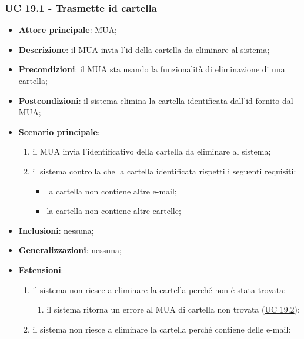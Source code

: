 \subsubsection{UC 19.1 - Trasmette id cartella} \label{sec:UC19.1}
    \begin{itemize}
        \item \textbf{Attore principale}: MUA;
        \item \textbf{Descrizione}: il MUA invia l'id della cartella da eliminare al sistema;
        \item \textbf{Precondizioni}: il MUA sta usando la funzionalità di eliminazione di una cartella;
        \item \textbf{Postcondizioni}: il sistema elimina la cartella identificata dall'id fornito dal MUA;
        \item \textbf{Scenario principale}:
            \begin{enumerate}
                \item il MUA invia l'identificativo della cartella da eliminare al sistema;
                \item il sistema controlla che la cartella identificata rispetti i seguenti requisiti:
                \begin{itemize}
                    \item la cartella non contiene altre e-mail;
                    \item la cartella non contiene altre cartelle;
                \end{itemize}
            \end{enumerate}
        \item \textbf{Inclusioni}: nessuna;
        \item \textbf{Generalizzazioni}: nessuna;
        \item \textbf{Estensioni}:
            \begin{enumerate}[label=\alph*.]
                \item il sistema non riesce a eliminare la cartella perché non è stata trovata:
                \begin{enumerate}[label=\arabic*.]
                    \item il sistema ritorna un errore al MUA di cartella non trovata (\hyperref[sec:UC19.2]{UC 19.2});
                \end{enumerate}
                \item il sistema non riesce a eliminare la cartella perché contiene delle e-mail:
                \begin{enumerate}[label=\arabic*.]

\end{enumerate}
\end{enumerate}
\end{itemize}
